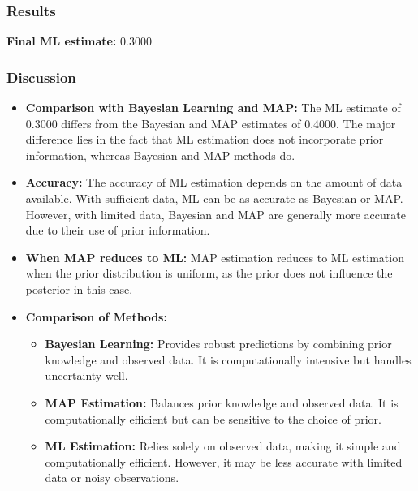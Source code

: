 \documentclass{article}
\begin{document}
\subsubsection*{Results}
\textbf{Final ML estimate:} 0.3000 \\

\subsubsection*{Discussion}
\begin{itemize}
    \item \textbf{Comparison with Bayesian Learning and MAP:} The ML estimate of 0.3000 differs from the Bayesian and MAP estimates of 0.4000. The major difference lies in the fact that ML estimation does not incorporate prior information, whereas Bayesian and MAP methods do.
    \item \textbf{Accuracy:} The accuracy of ML estimation depends on the amount of data available. With sufficient data, ML can be as accurate as Bayesian or MAP. However, with limited data, Bayesian and MAP are generally more accurate due to their use of prior information.
    \item \textbf{When MAP reduces to ML:} MAP estimation reduces to ML estimation when the prior distribution is uniform, as the prior does not influence the posterior in this case.
    \item \textbf{Comparison of Methods:}
    \begin{itemize}
        \item \textbf{Bayesian Learning:} Provides robust predictions by combining prior knowledge and observed data. It is computationally intensive but handles uncertainty well.
        \item \textbf{MAP Estimation:} Balances prior knowledge and observed data. It is computationally efficient but can be sensitive to the choice of prior.
        \item \textbf{ML Estimation:} Relies solely on observed data, making it simple and computationally efficient. However, it may be less accurate with limited data or noisy observations.
    \end{itemize}
\end{itemize}
\end{document}
